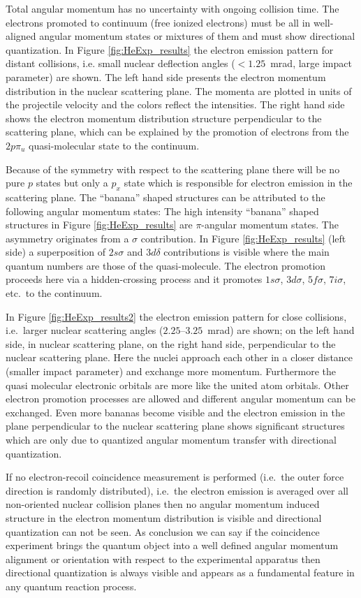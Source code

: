 \documentclass[12pt]{article}
\begin{document}
Total angular momentum has no uncertainty with ongoing collision time. The electrons promoted to continuum (free ionized electrons) must be all in well-aligned angular momentum states or mixtures of them and must show directional quantization. In Figure \ref{fig:HeExp_results} the electron emission pattern for distant collisions, i.e. small nuclear deflection angles ($<1.25$~mrad, large impact parameter) are shown. The left hand side presents the electron momentum distribution in the nuclear scattering plane. The momenta are plotted in units of the projectile velocity and the colors reflect the intensities. The right hand side shows the electron momentum distribution structure perpendicular to the scattering plane, which can be explained by the promotion of electrons from the $2p{\pi}_u$ quasi-molecular state to the continuum.
      
Because of the symmetry with respect to the scattering plane there will be no pure $p$ states but only a $p_x$ state which is responsible for electron emission in the scattering plane. The ``banana'' shaped structures can be attributed to the following angular momentum states: The high intensity ``banana'' shaped structures in Figure \ref{fig:HeExp_results} are $\pi$-angular momentum states. The asymmetry originates from a $\sigma$ contribution. In Figure \ref{fig:HeExp_results} (left side) a superposition of $2s\sigma$ and $3d\delta$ contributions is visible where the main quantum numbers are those of the quasi-molecule. The electron promotion proceeds here via a hidden-crossing process and it promotes $1s\sigma$, $3d\sigma$, $5f\sigma$, $7i\sigma$, etc.\ to the continuum.     
      
In Figure \ref{fig:HeExp_results2} the electron emission pattern for close collisions, i.e.\ larger nuclear scattering angles ($2.25$--$3.25$~mrad) are shown; on the left hand side, in nuclear scattering plane, on the right hand side, perpendicular to the nuclear scattering plane. Here the nuclei approach each other in a closer distance (smaller impact parameter) and exchange more momentum. Furthermore the quasi molecular electronic orbitals are more like the united atom orbitals. Other electron promotion processes are allowed and different angular momentum can be exchanged. Even more bananas become visible and the electron emission in the plane perpendicular to the nuclear scattering plane shows significant structures which are only due to quantized angular momentum transfer with directional quantization. 
      
If no electron-recoil coincidence measurement is performed (i.e.\ the outer force direction is randomly distributed), i.e.\ the electron emission is averaged over all non-oriented nuclear collision planes then  no angular momentum induced structure in the electron momentum distribution is visible and directional quantization can not be seen.  As conclusion we can say if the coincidence experiment brings the quantum object into a well defined angular momentum alignment or orientation with respect to the experimental apparatus then directional quantization is always visible and appears as a fundamental feature in any quantum reaction process. 
\end{document}
